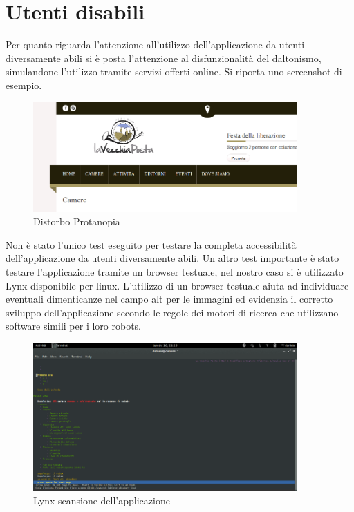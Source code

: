 \documentclass[a4paper,12pt,hidelinks]{report}
\begin{document}
\newpage
\section*{Utenti disabili}
Per quanto riguarda l'attenzione all'utilizzo dell'applicazione da utenti diversamente abili si è posta l'attenzione al disfunzionalità del daltonismo, simulandone l'utilizzo 
tramite servizi offerti online. Si riporta uno screenshot di esempio.

\begin{figure}[h!]%
    \includegraphics[width=0.9\textwidth,keepaspectratio=true]{../img/daltonismo}
    \centering
    \caption{Distorbo Protanopia}%
    \label{fig:daltonismo}%
\end{figure}
\par Non è stato l'unico test eseguito per testare la completa accessibilità dell'applicazione da utenti diversamente abili. 
Un altro test importante è stato testare l'applicazione tramite un browser testuale, nel nostro caso si è utilizzato Lynx disponibile per linux. 
L'utilizzo di un browser testuale aiuta ad individuare eventuali dimenticanze nel campo alt per le immagini ed evidenzia il corretto 
sviluppo dell'applicazione secondo le regole dei motori di ricerca che utilizzano software simili per i loro robots.

\begin{figure}[h!]%
    \includegraphics[width=0.9\textwidth,keepaspectratio=true]{../img/lynx}
    \centering
    \caption{Lynx scansione dell'applicazione}%
    \label{fig:lynx}%
\end{figure}
\end{document}
